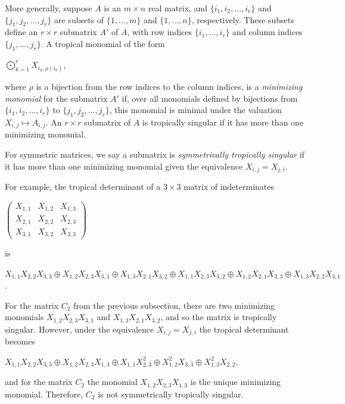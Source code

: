 \documentclass{article}
\begin{document}
More generally, suppose $A$ is an $m \times n$ real matrix, and $\{i_{1},i_{2},\ldots,i_{r}\}$ and $\{j_{1},j_{2},\ldots,j_{r}\}$ are subsets of $\{1,\ldots,m\}$ and $\{1,\ldots,n\}$, respectively. These subsets define an $r \times r$ submatrix $A'$ of $A$, with row indices $\{i_{1},\ldots,i_{r}\}$ and column indices $\{j_{1},\ldots,j_{r}\}$. A tropical monomial of the form
\begin{center}
  $\bigodot_{k = 1}^{r}X_{i_{k},\rho(i_{k})}$,
\end{center}
where $\rho$ is a bijection from the row indices to the column indices, is a \emph{minimizing monomial} for the submatrix $A'$ if, over all monomials defined by bijections from $\{i_{1},i_{2},\ldots,i_{r}\}$ to $\{j_{1},j_{2},\ldots,j_{r}\}$, this monomial is minimal under the valuation $X_{i,j} \mapsto A_{i,j}$. An $r \times r$ submatrix of $A$ is tropically singular if it has more than one minimizing monomial.

For symmetric matrices, we say a submatrix is \emph{symmetrically tropically singular} if it has more than one minimizing monomial given the equivalence $X_{i,j} = X_{j,i}$. 

For example, the tropical determinant of a $3 \times 3$ matrix of indeterminates 
\begin{center}
  $\left(\begin{array}{ccc} X_{1,1} & X_{1,2} & X_{1,3} \\ X_{2,1} & X_{2,2} & X_{2,3} \\ X_{3,1} & X_{3,2} & X_{3,3} \end{array}\right)$
\end{center}
is
\begin{center}
  $X_{1,1}X_{2,2}X_{3,3} \oplus X_{1,2}X_{2,3}X_{3,1} \oplus X_{1,3}X_{2,1}X_{3,2} \oplus X_{1,1}X_{2,3}X_{3,2} \oplus X_{1,2}X_{2,1}X_{3,3} \oplus X_{1,3}X_{2,2}X_{3,1}$.
\end{center}
For the matrix $C_{2}$ from the previous subsection, there are two minimizing monomials $X_{1,2}X_{2,3}X_{3,1}$ and $X_{1,3}X_{2,1}X_{3,2}$, and so the matrix is tropically singular. However, under the equivalence $X_{i,j} = X_{j,i}$ the tropical determinant becomes
\begin{center}
  $X_{1,1}X_{2,2}X_{3,3} \oplus X_{1,2}X_{2,3}X_{1,3} \oplus X_{1,1}X_{2,3}^{2} \oplus X_{1,2}^{2}X_{3,3} \oplus X_{1,3}^{2}X_{2,2}$,
\end{center}
and for the matrix $C_{2}$ the monomial $X_{1,2}X_{2,3}X_{1,3}$ is the unique minimizing monomial. Therefore, $C_{2}$ is not symmetrically tropically singular.
\end{document}
